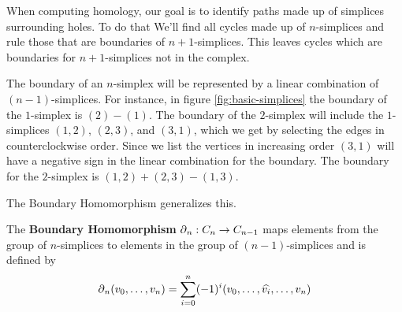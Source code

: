 {%
%         

When computing homology, our goal is to identify paths made up of simplices surrounding holes. To do that We'll find all cycles made up of \(n\)-simplices and rule those that are boundaries of \(n+1\)-simplices. This leaves cycles which are boundaries for \(n+1\)-simplices not in the complex.

The boundary of an \(n\)-simplex will be represented by a linear combination of \((n-1)\)-simplices. For instance, in figure \ref{fig:basic-simplices} the boundary of the \(1\)-simplex is \((2)-(1)\). The boundary of the \(2\)-simplex will include the \(1\)-simplices \((1,2)\), \((2,3)\), and \((3,1)\), which we get by selecting the edges in counterclockwise order. Since we list the vertices in increasing order \((3,1)\) will have a negative sign in the linear combination for the boundary. The boundary for the \(2\)-simplex is \((1,2) + (2,3) - (1,3)\).

The Boundary Homomorphism generalizes this.

\begin{definition}
    The \textbf{Boundary Homomorphism} \(\operatorname{\partial}_n : C_n \to C_{n-1}\) maps elements from the group of \(n\)-simplices to elements in the group of \((n-1)\)-simplices and is defined by
    \[
        \operatorname{\partial}_n (v_0,\dots , v_{n}) = \sum_{i=0}^n (-1)^{i}
        (v_0,\dots, \widehat{v_i}, \dots, v_n)
    \]
    \cite{hatcher}
\end{definition}

}
